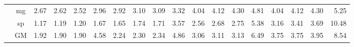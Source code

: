 \begin{table*}[]
\begin{center}
{\begin{tabular}{|c|c|rrrr|rrrr|rrrr|rrrr|}
 &  mg  &  2.67  & \cellcolor{blue!25} 2.62  & \cellcolor{blue!25} 2.52  &   2.96  &  2.92  &  3.10  & \cellcolor{blue!25} 3.09  &   3.32  &  4.04  &  4.12  &  4.30  &   4.81  &  4.04  &  4.12  &  4.30  &   5.25 \\
 &  sp  &  1.17  &  1.19  &  1.20  &   1.67  &  1.65  &  1.74  & \cellcolor{blue!25} 1.71  &   3.57  &  2.56  &  2.68  &  2.75  &   5.38  &  3.16  &  3.41  &  3.69  &  10.48 \\
 &  GM  &  1.92  & \cellcolor{blue!25} 1.90  &  1.90  &   4.58  &  2.24  &  2.30  &  2.34  &   4.86  &  3.06  &  3.11  &  3.13  &   6.49  &  3.75  &  3.75  &  3.95  &   8.54 \\
\hline 
\end{tabular} }

\end{center}
\end{table*}
